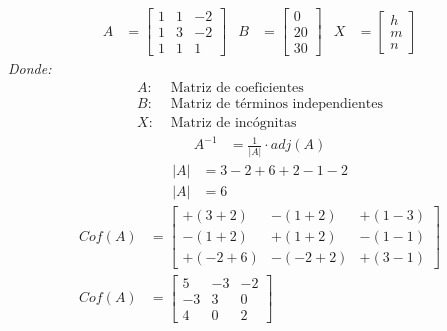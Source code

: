 \documentclass[10pt, a4paper]{article}
\begin{document}
\begin{multicols*}{2}
\begin{align*}
  A &= \begin{bmatrix}
    1 & 1 & -2\\
    1 & 3 & -2\\
    1 & 1 & 1
  \end{bmatrix}&
  B &= \begin{bmatrix}
    0\\
    20\\
    30
  \end{bmatrix}&
  X &= \begin{bmatrix}
    h\\
    m\\
    n
  \end{bmatrix}
\end{align*}
\textit{Donde:}
\begin{align*}
  A: &\text{ Matriz de coeficientes}\\
  B: &\text{ Matriz de términos independientes}\\
  X: &\text{ Matriz de incógnitas}
\end{align*}
\begin{align*}
  A^{-1} &= \frac{1}{\left|A\right|} \cdot adj\left(A\right)
\end{align*}
\begin{align*}
  \left|A\right| &= 3 - 2 + 6 + 2 - 1 - 2\\
  \left|A\right| &= 6
\end{align*}
\begin{align*}
  Cof\left(A\right) &= \begin{bmatrix}
    +\left(3+2\right) & -\left(1+2\right) & +\left(1-3\right)\\
    -\left(1+2\right) & +\left(1+2\right) & -\left(1-1\right)\\
    +\left(-2+6\right) & -\left(-2+2\right) & +\left(3-1\right)
  \end{bmatrix}\\
  Cof\left(A\right) &= \begin{bmatrix}
    5 & -3 & -2\\
    -3 & 3 & 0\\
    4 & 0 & 2
  \end{bmatrix}
\end{align*}

\end{multicols*}
\end{document}
